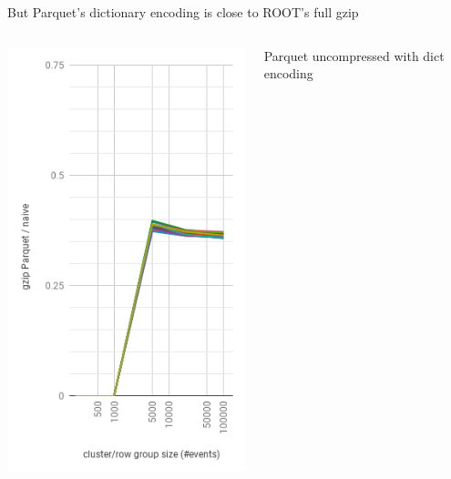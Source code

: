 \documentclass[aspectratio=169]{beamer}
\begin{document}
\begin{frame}{But Parquet's dictionary encoding is close to ROOT's full gzip}
\begin{columns}
\begin{center}
\includegraphics[width=\linewidth]{parquet-gzip-2.png}
\end{center}
\begin{center}
Parquet uncompressed
with dict encoding


\end{center}
\end{columns}
\end{frame}
\end{document}
